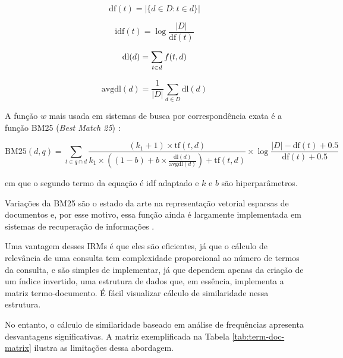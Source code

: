 \documentclass[
	12pt,				%
	openright,			%
	oneside,			%
	a4paper,			%
	english,			%
	french,				%
	spanish,			%
	brazil				%
	]{abntex2}
\begin{document}
\begin{equation}
\text{df}(t) = \left| \{ d \in D : t \in d \} \right|
\label{eq:df}
\end{equation}

\begin{equation}
\text{idf}(t) = \log \frac{|D|}{\text{df}(t)}
\label{eq:idf}
\end{equation}

\begin{equation}
\text{dl}(d) = \sum_{t \in d} f(t,d) \\
\label{eq:dl}
\end{equation}

\begin{equation}
\text{avgdl}(d) = \frac{1}{|D|} \sum_{d \in D} \text{dl}(d)
\label{eq:}
\end{equation}


A função $w$ mais usada em sistemas de busca por correspondência exata é a função BM25 (\textit{Best Match 25}) \cite{biblia}:

\begin{equation}
\text{BM25}(d,q) = \sum_{t \in q \cap d} \frac{(k_1 + 1) \times \text{tf}(t,d)}{k_1 \times ((1-b) + b \times \frac{\text{dl}(d)}{\text{avgdl}(d)}) + \text{tf}(t,d)} \times \log \frac{|D| - \text{df}(t) + 0.5}{\text{df}(t) + 0.5}
\end{equation}

em que o segundo termo da equação é idf adaptado e $k$ e $b$ são hiperparâmetros.

Variações da BM25 são o estado da arte na representação vetorial esparsas de documentos e, por esse motivo, essa função ainda é largamente implementada em sistemas de recuperação de informações \cite{biblia}.

Uma vantagem desses IRMs é que eles são eficientes, já que o cálculo de relevância de uma consulta tem complexidade proporcional ao número de termos da consulta, e são simples de implementar, já que dependem
apenas da criação de um índice invertido, uma estrutura de dados que, em essência, implementa a matriz termo-documento.
É fácil visualizar cálculo de similaridade nessa estrutura.

No entanto, o cálculo de similaridade baseado em análise de frequências apresenta desvantagens significativas. A matriz exemplificada na Tabela \ref{tab:term-doc-matrix} ilustra as limitações dessa abordagem.
\end{document}
